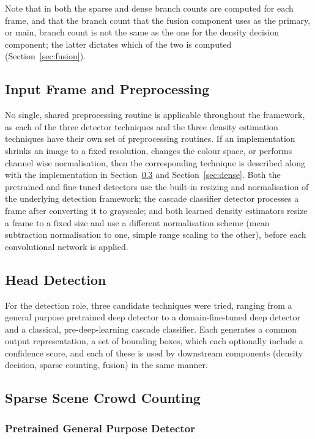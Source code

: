 Note that in both the sparse and dense branch counts are computed for each frame, and that the branch count that the fusion component uses as the primary, or main, branch count is not the same as the one for the density decision component; the latter dictates which of the two is computed (Section~\ref{sec:fusion}).

\subsection{Input Frame and Preprocessing}

No single, shared preprocessing routine is applicable throughout the framework, as each of the three detector techniques and the three density estimation techniques have their own set of preprocessing routines. If an implementation shrinks an image to a fixed resolution, changes the colour space, or performs channel wise normalisation, then the corresponding technique is described along with the implementation in Section~\ref{sec:sparse} and Section~\ref{sec:dense}. Both the pretrained and fine-tuned detectors use the built-in resizing and normalisation of the underlying detection framework; the cascade classifier detector processes a frame after converting it to grayscale; and both learned density estimators resize a frame to a fixed size and use a different normalisation scheme (mean subtraction normalisation to one, simple range scaling to the other), before each convolutional network is applied.

\subsection{Head Detection}
\label{sec:sparse-detection}
For the detection role, three candidate techniques were tried, ranging from a general purpose pretrained deep detector to a domain-fine-tuned deep detector and a classical, pre-deep-learning cascade classifier. Each generates a common output representation, a set of bounding boxes, which each optionally include a confidence score, and each of these is used by downstream components (density decision, sparse counting, fusion) in the same manner.

\subsection{Sparse Scene Crowd Counting}
\label{sec:sparse}

\subsubsection{Pretrained General Purpose Detector}

